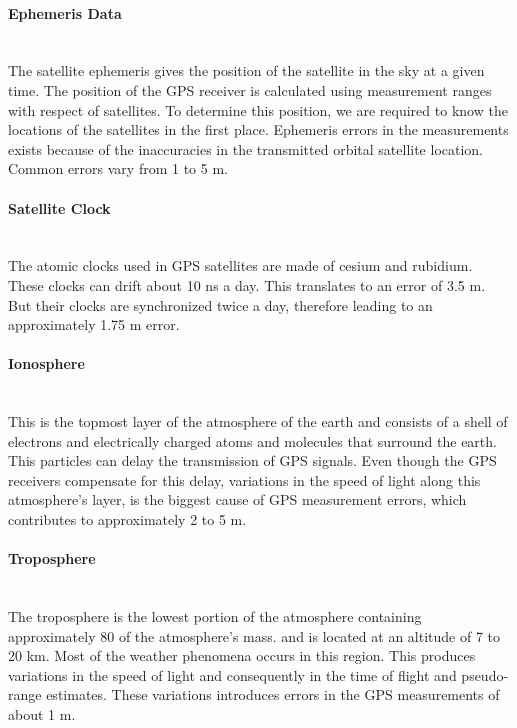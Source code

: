 \paragraph{Ephemeris Data} \hspace{0pt} \\
The satellite ephemeris gives the position of the satellite in the sky at a given time. The position of the GPS receiver is calculated using measurement ranges with respect of satellites. To determine this position, we are required to know the locations of the satellites in the first place. Ephemeris errors in the measurements exists because of the inaccuracies in the transmitted orbital satellite location. Common errors vary from 1 to 5 m.

\paragraph{Satellite Clock} \hspace{0pt} \\
The atomic clocks used in GPS satellites are made of cesium and rubidium. These clocks can drift about 10 ns a day. This translates to an error of 3.5 m. But their clocks are synchronized twice a day, therefore leading to an approximately 1.75 m error.

\paragraph{Ionosphere} \hspace{0pt} \\
This is the topmost layer of the atmosphere of the earth and consists of a shell of electrons and electrically charged atoms and molecules that surround the earth. This particles can delay the transmission of GPS signals. Even though the GPS receivers compensate for this delay, variations in the speed of light along this atmosphere's layer, is the biggest cause of GPS measurement errors, which contributes to approximately 2 to 5 m.

\paragraph{Troposphere} \hspace{0pt} \\
The troposphere is the lowest portion of the atmosphere containing approximately 80 of the atmosphere's mass. and is located at an altitude of 7 to 20 km. Most of the weather phenomena occurs in this region. This produces variations in the speed of light and consequently in the time of flight and pseudo-range estimates. These variations introduces errors in the GPS measurements of about 1 m.

